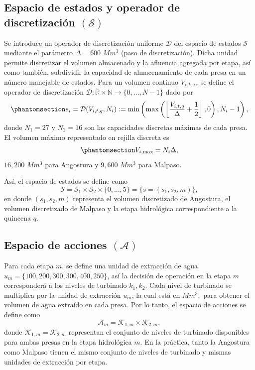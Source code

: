 \documentclass[
  letterpaper,
  DIV=11,
  numbers=noendperiod]{scrreprt}
\theoremstyle{definition}
\theoremstyle{remark}
\begin{document}
\subsection{\texorpdfstring{Espacio de estados y operador de
discretización
\((\mathcal{S})\)}{Espacio de estados y operador de discretización (\textbackslash mathcal\{S\})}}\label{espacio-de-estados-y-operador-de-discretizaciuxf3n-mathcals}

Se introduce un operador de discretización uniforme \(\mathcal{D}\) del
espacio de estados \(\mathcal{S}\) mediante el parámetro
\(\Delta = 600\) \(Mm^3\) (paso de discretización). Dicha unidad permite
discretizar el volumen almacenado y la afluencia agregada por etapa, así
como también, subdividir la capacidad de almacenamiento de cada presa en
un número manejable de estados. Para un volumen continuo \(V_{i,t,q},\)
se define el operador de discretización
\(\mathcal{D}: \mathbb{R} \times \mathbb{N} \longrightarrow \{0,\dots,N-1\}\)
dado por
\begin{equation}\protect\phantomsection\label{eq-discretizacion}{s_i = \mathcal{D}(V_{i,t,q}, N_i) := \min \left(\max\left(\left\lfloor \frac{V_{i,t,q}}{\Delta} + \frac{1}{2}\right\rfloor, 0\right), N_i-1\right),}\end{equation}
donde \(N_1 = 27\) y \(N_2 = 16\) son las capacidades discretas máximas
de cada presa. El volumen máximo representado en rejilla discreta es
\begin{equation}\protect\phantomsection\label{eq-volumen-maximo}{V_{i,\max} = N_i \Delta,}\end{equation}
\(16,200\) \(Mm^3\) para Angostura y \(9,600\) \(Mm^3\) para Malpaso.

Así, el espacio de estados se define como
\[\mathcal{S} = \mathcal{S}_1 \times \mathcal{S}_2 \times \{0,...,5\} = \{s = (s_1,s_2,m)\},\]
en donde \((s_1,s_2,m)\) representa el volumen discretizado de
Angostura, el volumen discretizado de Malpaso y la etapa hidrológica
correspondiente a la quincena \(q\).

\subsection{\texorpdfstring{Espacio de acciones
\((\mathcal{A})\)}{Espacio de acciones (\textbackslash mathcal\{A\})}}\label{espacio-de-acciones-mathcala}

Para cada etapa \(m\), se define una unidad de extracción de agua
\(u_m = \{100, 200, 300, 300, 400, 250\}\), así la decisión de operación
en la etapa \(m\) corresponderá a los niveles de turbinado \(k_1, k_2\).
Cada nivel de turbinado se multiplica por la unidad de extracción
\(u_m\), la cual está en \(Mm^3,\) para obtener el volumen de agua
extraído en cada presa. Por lo tanto, el espacio de acciones se define
como \[\mathcal{A}_m = \mathcal{K}_{1,m} \times \mathcal{K}_{2,m},\]
donde \(\mathcal{K}_{1,m} = \mathcal{K}_{2,m}\) representan el conjunto
de niveles de turbinado disponibles para ambas presas en la etapa
hidrológica \(m\). En la práctica, tanto la Angostura como Malpaso
tienen el mismo conjunto de niveles de turbinado y mismas unidades de
extracción por etapa.
\end{document}
